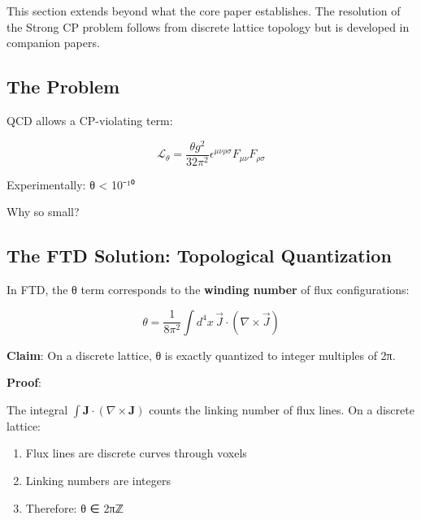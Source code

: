 \documentclass[
  11pt,
  letterpaper,
  twoside,
  openright]{book}
\providecommand{\tightlist}{%
  \setlength{\itemsep}{0pt}\setlength{\parskip}{0pt}}
\begin{document}
\begin{tcolorbox}[enhanced jigsaw, coltitle=black, colbacktitle=quarto-callout-note-color!10!white, toprule=.15mm, colframe=quarto-callout-note-color-frame, arc=.35mm, opacityback=0, bottomtitle=1mm, toptitle=1mm, breakable, colback=white, titlerule=0mm, opacitybacktitle=0.6, title=\textcolor{quarto-callout-note-color}{\faInfo}\hspace{0.5em}{Companion Work}, rightrule=.15mm, bottomrule=.15mm, leftrule=.75mm, left=2mm]

This section extends beyond what the core paper establishes. The
resolution of the Strong CP problem follows from discrete lattice
topology but is developed in companion papers.

\end{tcolorbox}

\subsection{The Problem}\label{the-problem-1}

QCD allows a CP-violating term:

\[\mathcal{L}_\theta = \frac{\theta g^2}{32\pi^2} \epsilon^{\mu\nu\rho\sigma} F_{\mu\nu}F_{\rho\sigma}\]

Experimentally: \textbar θ\textbar{} \textless{} 10⁻¹⁰

Why so small?

\subsection{The FTD Solution: Topological
Quantization}\label{the-ftd-solution-topological-quantization}

In FTD, the θ term corresponds to the \textbf{winding number} of flux
configurations:

\[\theta = \frac{1}{8\pi^2} \int d^4x \, \vec{J} \cdot (\nabla \times \vec{J})\]

\textbf{Claim}: On a discrete lattice, θ is exactly quantized to integer
multiples of 2π.

\textbf{Proof}:

The integral \(\int \mathbf{J} \cdot (\nabla \times \mathbf{J})\) counts
the linking number of flux lines. On a discrete lattice:

\begin{enumerate}
\def\labelenumi{\arabic{enumi}.}
\tightlist
\item
  Flux lines are discrete curves through voxels
\item
  Linking numbers are integers
\item
  Therefore: θ ∈ 2πℤ
\end{enumerate}
\end{document}
